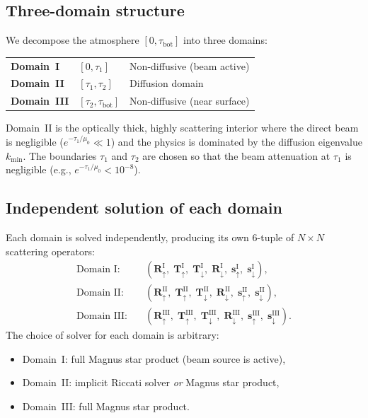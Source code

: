 \documentclass[11pt,a4paper]{article}
\newcommand{\vect}[1]{\bm{#1}}
\newcommand{\mat}[1]{\mathbf{#1}}
\newcommand{\tbot}{\tau_{\mathrm{bot}}}
\newcommand{\kmin}{k_{\min}}
\theoremstyle{definition}
\begin{document}
\subsection{Three-domain structure}

We decompose the atmosphere $[0,\tbot]$ into three domains:
\begin{center}
\begin{tabular}{lll}
\textbf{Domain~I}   & $[0, \tau_1]$         & Non-diffusive (beam active) \\
\textbf{Domain~II}  & $[\tau_1, \tau_2]$    & Diffusion domain \\
\textbf{Domain~III} & $[\tau_2, \tbot]$     & Non-diffusive (near surface)
\end{tabular}
\end{center}
Domain~II is the optically thick, highly scattering interior where the
direct beam is negligible ($e^{-\tau_1/\mu_0}\ll 1$) and the physics
is dominated by the diffusion eigenvalue $\kmin$.  The boundaries
$\tau_1$ and $\tau_2$ are chosen so that the beam attenuation at
$\tau_1$ is negligible (e.g., $e^{-\tau_1/\mu_0}<10^{-8}$).

\subsection{Independent solution of each domain}

Each domain is solved independently, producing its own 6-tuple of
$N\!\times\!N$ scattering operators:
\begin{align}
  \text{Domain~I:}\quad  &(\mat{R}_{\uparrow}^{\mathrm{I}},\;\mat{T}_{\uparrow}^{\mathrm{I}},\;\mat{T}_{\downarrow}^{\mathrm{I}},\;\mat{R}_{\downarrow}^{\mathrm{I}},\;\vect{s}_{\uparrow}^{\mathrm{I}},\;\vect{s}_{\downarrow}^{\mathrm{I}}), \\
  \text{Domain~II:}\quad &(\mat{R}_{\uparrow}^{\mathrm{II}},\;\mat{T}_{\uparrow}^{\mathrm{II}},\;\mat{T}_{\downarrow}^{\mathrm{II}},\;\mat{R}_{\downarrow}^{\mathrm{II}},\;\vect{s}_{\uparrow}^{\mathrm{II}},\;\vect{s}_{\downarrow}^{\mathrm{II}}), \\
  \text{Domain~III:}\quad &(\mat{R}_{\uparrow}^{\mathrm{III}},\;\mat{T}_{\uparrow}^{\mathrm{III}},\;\mat{T}_{\downarrow}^{\mathrm{III}},\;\mat{R}_{\downarrow}^{\mathrm{III}},\;\vect{s}_{\uparrow}^{\mathrm{III}},\;\vect{s}_{\downarrow}^{\mathrm{III}}).
\end{align}
The choice of solver for each domain is arbitrary:
\begin{itemize}[nosep]
\item Domain~I: full Magnus star product (beam source is active),
\item Domain~II: implicit Riccati solver \emph{or} Magnus star product,
\item Domain~III: full Magnus star product.
\end{itemize}
\end{document}
